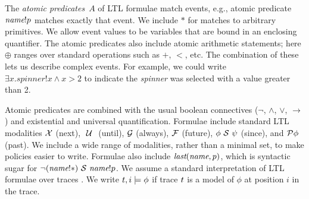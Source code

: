 The \emph{atomic predicates}~$A$ of LTL formulae match events,
e.g., atomic predicate $\textit{name}!p$ matches exactly that event.
We include $\ast$ for matches to
arbitrary primitives. We allow event values to be
variables that are bound in an enclosing quantifier. The atomic
predicates also include atomic arithmetic
statements; here $\oplus$ ranges over standard operations such as $+$,
$<$, etc.  
The combination of these lets us describe complex
events. For example, we could write
$\exists x. \textit{spinner}!x \wedge x > 2$ to indicate the
\emph{spinner} was selected with a value greater than 2.

Atomic predicates are combined with the usual boolean connectives
($\neg$, $\wedge$, $\vee$, $\rightarrow$) and existential and
universal quantification.  Formulae include standard LTL
modalities $\mathcal{X}$ (next), $~\mathcal{U}~$
(until), $\mathcal{G}$ (always), $\mathcal{F}$ (future), $\phi ~\mathcal{S}~ \psi$
(since), and $\mathcal{P} \phi$ (past). We include a wide range of
modalities, rather than a minimal set, to make policies easier to write.
Formulae also include
$\textit{last}(\textit{name}, p)$, which is syntactic sugar for $\lnot (\textit{name}!\ast)
~\mathcal{S}~ \textit{name}!p$.
We assume a standard interpretation of LTL formulae over
traces \cite{Lichtenstein:85}.
We write $t, i \models \phi$ if trace $t$ is a model of $\phi$ at
position $i$ in the trace.


